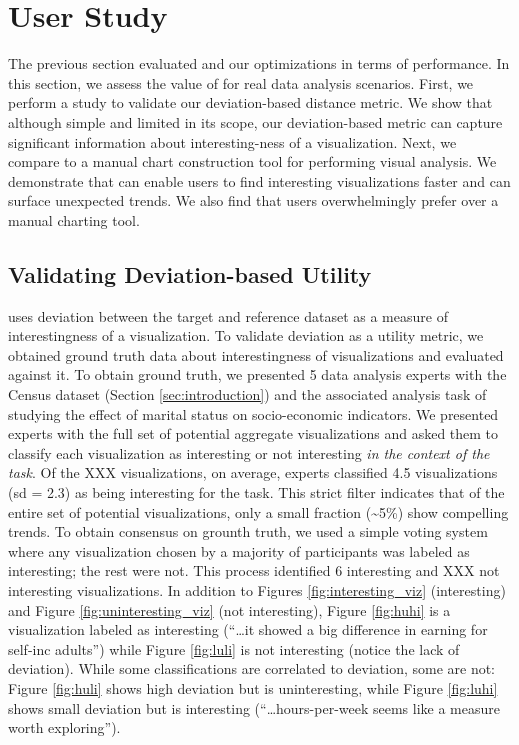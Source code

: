 
\section{User Study}
\label{sec:user_study}

The previous section evaluated \SeeDB and our optimizations in terms of 
performance.
In this section, we assess the value of \SeeDB for real data analysis 
scenarios.
First, we perform a study to validate our deviation-based distance metric.
We show that although simple and limited in its scope, our deviation-based
metric can capture significant information about interesting-ness
of a visualization.
Next, we compare \SeeDB to a manual chart construction tool for performing
visual analysis.
We demonstrate that \SeeDB can enable users to find interesting visualizations
faster and can surface unexpected trends.
We also find that users overwhelmingly prefer \SeeDB over a manual charting 
tool.

\subsection{Validating Deviation-based Utility}
\label{sec:validating_metric}

\SeeDB uses deviation between the target and reference dataset as a measure
of interestingness of a visualization.
To validate deviation as a utility metric, we obtained ground truth data about
interestingness of visualizations and evaluated \SeeDB against it.
To obtain ground truth, we presented 5 data analysis experts with the Census 
dataset (Section \ref{sec:introduction}) and the associated analysis task of
studying the effect of marital status on socio-economic indicators.
We presented experts with the full set of potential aggregate visualizations 
and asked them to classify each visualization as interesting or
not interesting {\em in the context of the task}.
Of the XXX visualizations, on average, experts classified 4.5 visualizations
(sd = 2.3) as being interesting for the task.
This strict filter indicates that of the entire set of potential visualizations, 
only a small fraction (\textasciitilde5\%) show compelling trends.
To obtain consensus on grounth truth, we used a simple voting system where
any visualization chosen by a majority of participants was labeled as 
interesting; the rest were not. 
This process identified 6 interesting and XXX not interesting visualizations.
In addition to Figures \ref{fig:interesting_viz} (interesting) and Figure 
\ref{fig:uninteresting_viz} (not interesting), Figure \ref{fig:huhi} is 
a visualization labeled as interesting (``\ldots it
showed a big difference in earning for self-inc adults'') while 
Figure \ref{fig:luli} is not interesting (notice the lack of deviation).
While some classifications are correlated to deviation, some are not: 
Figure \ref{fig:huli} shows high deviation but is uninteresting, 
while Figure \ref{fig:luhi} shows small 
deviation but is interesting (``\ldots hours-per-week seems like a 
measure worth exploring''). 

